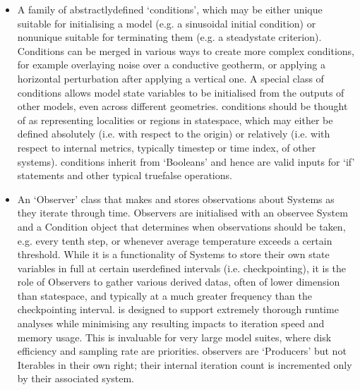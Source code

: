 \documentclass[letterpaper,10pt,english]{jupyterBook}
\begin{document}
\begin{itemize}
\item {} 
\sphinxAtStartPar
A family of abstractly\sphinxhyphen{}defined ‘conditions’, which may be either unique \sphinxhyphen{} suitable for initialising a model (e.g. a sinusoidal initial condition) \sphinxhyphen{} or non\sphinxhyphen{}unique \sphinxhyphen{} suitable for terminating them (e.g. a steady\sphinxhyphen{}state criterion). Conditions can be merged in various ways to create more complex conditions, for example overlaying noise over a conductive geotherm, or applying a horizontal perturbation after applying a vertical one. A special class of conditions allows model state variables to be initialised from the outputs of other models, even across different geometries.  conditions should be thought of as representing localities or regions in state\sphinxhyphen{}space, which may either be defined absolutely (i.e. with respect to the origin) or relatively (i.e. with respect to internal metrics, typically timestep or time index, of other systems).  conditions inherit from  ‘Booleans’ and hence are valid inputs for  ‘if’ statements and other typical true\sphinxhyphen{}false operations.

\item {} 
\sphinxAtStartPar
An ‘Observer’ class that makes and stores observations about Systems as they iterate through time. Observers are initialised with an observee System and a Condition object that determines when observations should be taken, e.g. every tenth step, or whenever average temperature exceeds a certain threshold. While it is a functionality of Systems to store their own state variables in full at certain user\sphinxhyphen{}defined intervals (i.e. checkpointing), it is the role of Observers to gather various derived datas, often of lower dimension than state\sphinxhyphen{}space, and typically at a much greater frequency than the checkpointing interval.  is designed to support extremely thorough runtime analyses while minimising any resulting impacts to iteration speed and memory usage. This is invaluable for very large model suites, where disk efficiency and sampling rate are priorities.  observers are  ‘Producers’ but not Iterables in their own right; their internal iteration count is incremented only by their associated system.


\end{itemize}
\end{document}
